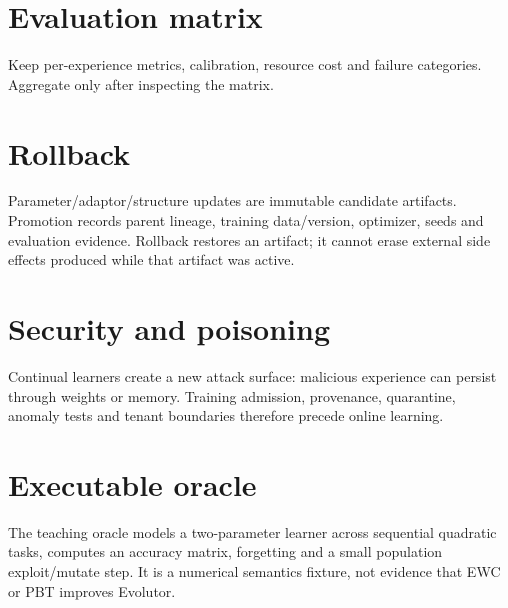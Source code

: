 \section{Evaluation matrix}
Keep per-experience metrics, calibration, resource cost and failure categories. Aggregate only after inspecting the matrix.

\section{Rollback}
Parameter/adaptor/structure updates are immutable candidate artifacts. Promotion records parent lineage, training data/version, optimizer, seeds and evaluation evidence. Rollback restores an artifact; it cannot erase external side effects produced while that artifact was active.

\section{Security and poisoning}
Continual learners create a new attack surface: malicious experience can persist through weights or memory. Training admission, provenance, quarantine, anomaly tests and tenant boundaries therefore precede online learning.

\section{Executable oracle}
The teaching oracle models a two-parameter learner across sequential quadratic tasks, computes an accuracy matrix, forgetting and a small population exploit/mutate step. It is a numerical semantics fixture, not evidence that EWC or PBT improves Evolutor.

